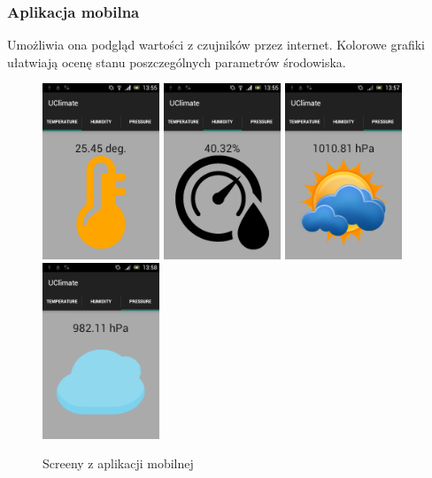 \documentclass[12pt,a4paper]{article}
\begin{document}
\newpage

\subsubsection{Aplikacja mobilna}
Umożliwia ona podgląd wartości z czujników przez internet. Kolorowe grafiki ułatwiają ocenę stanu poszczególnych parametrów środowiska. 
\begin{figure}[!h]	
\centering
	\includegraphics[width =35mm]{dev1.png}
	\includegraphics[width =35mm]{dev2.png}
	\includegraphics[width =35mm]{dev3.png}
	\includegraphics[width =35mm]{dev4.png}
	\label{ESP8266}
	\caption{Screeny z aplikacji mobilnej}
\end{figure}
\end{document}
